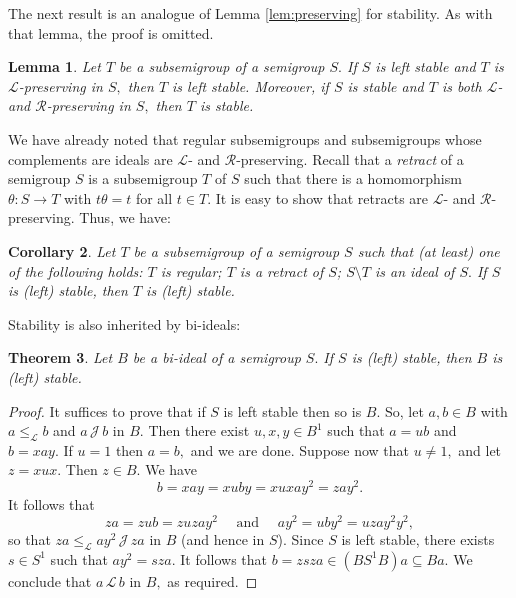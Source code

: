 \documentclass[twoside,a4paper,12pt,reqno]{amsart}
\theoremstyle{plain}
\newtheorem{thm}{Theorem}[section]
\newtheorem{cor}[thm]{Corollary}
\newtheorem{lem}[thm]{Lemma}
\theoremstyle{definition}
\renewcommand{\l}{\mbox{${\mathcal{L}}$}}
\renewcommand{\r}{\mbox{${\mathcal{R}}$}}
\renewcommand{\j}{\mbox{${\mathcal{J}}$}}
\newcommand{\leql}{\leq_{\mathcal{L}}}
\renewcommand{\th}{\theta}
\renewcommand{\th}{\theta}
\newcommand{\sm}{\setminus}
\begin{document}

The next result is an analogue of Lemma \ref{lem:preserving} for stability.  As with that lemma, the proof is omitted.

\begin{lem}
Let $T$ be a subsemigroup of a semigroup $S.$  If $S$ is left stable and $T$ is $\l$-preserving in $S,$ then $T$ is left stable.  Moreover, if $S$ is stable and $T$ is both $\l$- and $\r$-preserving in $S,$ then $T$ is stable.
\end{lem}

We have already noted that regular subsemigroups and subsemigroups whose complements are ideals are $\l$- and $\r$-preserving.  Recall that a {\em retract} of a semigroup $S$ is a subsemigroup $T$ of $S$ such that there is a homomorphism $\th : S\to T$ with $t\th=t$ for all $t\in T.$  It is easy to show that retracts are $\l$- and $\r$-preserving.  Thus, we have:

\begin{cor}
Let $T$ be a subsemigroup of a semigroup $S$ such that (at least) one of the following holds: $T$ is regular; $T$ is a retract of $S$; $S{\sm}T$ is an ideal of $S.$  If $S$ is (left) stable, then $T$ is (left) stable.
\end{cor}

Stability is also inherited by bi-ideals:

\begin{thm}
Let $B$ be a bi-ideal of a semigroup $S.$  If $S$ is (left) stable, then $B$ is (left) stable.
\end{thm}

\begin{proof}
It suffices to prove that if $S$ is left stable then so is $B.$  So, let $a,b\in B$ with $a\leql b$ and $a\,\j\,b$ in $B.$  Then there exist $u,x,y\in B^1$ such that $a=ub$ and $b=xay.$  If $u=1$ then $a=b,$ and we are done.  Suppose now that $u\neq 1,$ and let $z=xux.$  Then $z\in B.$  We have
$$b=xay=xuby=xuxay^2=zay^2.$$
It follows that 
$$za=zub=zuzay^2\quad\text{ and }\quad ay^2=uby^2=uzay^2y^2,$$
so that $za\leql ay^2\,\j\,za$ in $B$ (and hence in $S$).  Since $S$ is left stable, there exists $s\in S^1$ such that $ay^2=sza.$  It follows that $b=zsza\in(BS^1B)a\subseteq Ba.$  We conclude that $a\,\l\,b$ in $B,$ as required.
\end{proof}
\end{document}
